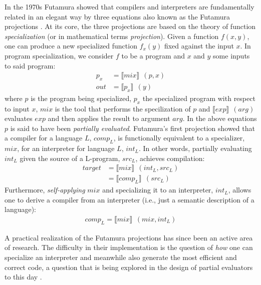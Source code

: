 \documentclass[a4paper,12pt,twoside,openright]{report}
\theoremstyle{definition}
\begin{document}
In the 1970s Futamura showed that compilers and interpreters are fundamentally related in  an elegant way by three equations also known as the Futamura projections \cite{futamura1999partial}. At its core, the three projections are based on the theory of function \textit{specialization} (or in mathematical terms \textit{projection}). Given a function $f(x,y)$, one can produce a new specialized function $f_{x}(y)$ fixed against the input $x$. In program specialization, we consider $f$ to be a program and $x$ and $y$ some inputs to said program:
\begin{align*}
    p_{x} & = \llbracket mix \rrbracket \:\: (p, x) \\
    out & = \llbracket p_{x} \rrbracket \:\: (y)
\end{align*}
where $p$ is the program being specialized, $p_{x}$ the specialized program with respect to input $x$, $mix$ is the tool that performs the specilization of $p$ and $\llbracket exp \rrbracket \:\: (arg)$ evaluates $exp$ and then applies the result to argument $arg$. In the above equations $p$ is said to have been \textit{partially evaluated}. Futamura's first projection showed that a compiler for a language $L$, $comp_{L}$, is functionally equivalent to a specializer, $mix$, for an interpreter for language $L$, $int_{L}$. In other words, partially evaluating $int_{L}$ given the source of a L-program, $src_{L}$, achieves compilation:
\begin{align*}
    target & = \llbracket mix \rrbracket \:\: (int_{L}, src_{L}) \\
           & = \llbracket comp_{L} \rrbracket \:\: (src_{L})
\end{align*}
Furthermore, \textit{self-applying} $mix$ and specializing it to an interpreter, $int_{L}$, allows one to derive a compiler from an interpreter (i.e., just a semantic description of a language):
\begin{align*}
    comp_{L} = \llbracket mix \rrbracket \:\: (mix, int_{L})
\end{align*}

A practical realization of the Futamura projections has since been an active area of research. The difficulty in their implementation is the question of \textit{how} one can specialize an interpreter and meanwhile also generate the most efficient and correct code, a question that is being explored in the design of partial evaluators to this day \cite{jones1988challenging,jones1993partial}.
\end{document}
